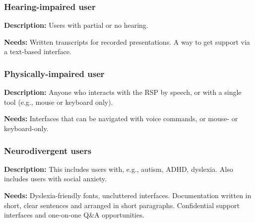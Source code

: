 \subsubsection{Hearing-impaired user}

\textbf{Description:}
Users with partial or no hearing.

\textbf{Needs:}
Written transcripts for recorded presentations.
A way to get support via a text-based interface. 

\subsubsection{Physically-impaired user}

\textbf{Description:}
Anyone who interacts with the RSP by speech, or with a single tool
(e.g., mouse or keyboard only).

\textbf{Needs:}
Interfaces that can be navigated with voice commands, or mouse- or keyboard-only.

\subsubsection{Neurodivergent users}

\textbf{Description:}
This includes users with, e.g., autism, ADHD, dyslexia.
Also includes users with social anxiety.

\textbf{Needs:}
Dyslexia-friendly fonts, uncluttered interfaces.
Documentation written in short, clear sentences and arranged in short paragraphs.
Confidential support interfaces and one-on-one Q\&A opportunities.
